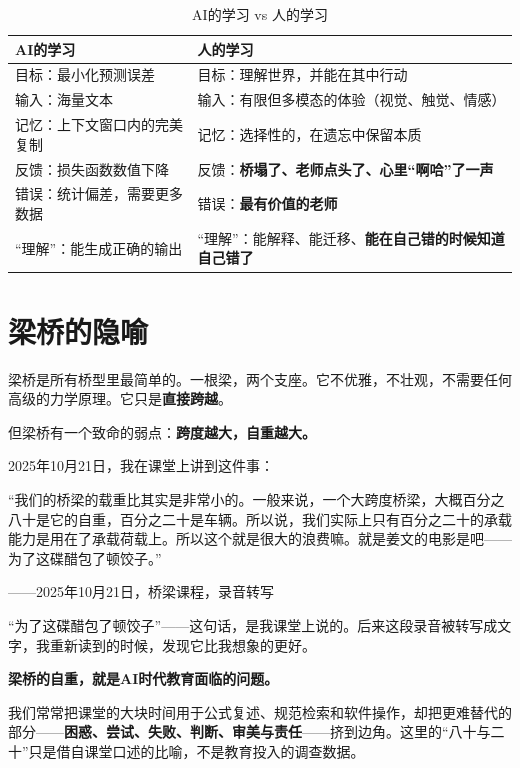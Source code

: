 \begin{table}[H]
\centering
\begin{tabular}{p{} p{}}
\toprule
\textbf{AI的学习} & \textbf{人的学习} \\
\midrule
目标：最小化预测误差 & 目标：理解世界，并能在其中行动 \\
\addlinespace
输入：海量文本 & 输入：有限但多模态的体验（视觉、触觉、情感） \\
\addlinespace
记忆：上下文窗口内的完美复制 & 记忆：选择性的，在遗忘中保留本质 \\
\addlinespace
反馈：损失函数数值下降 & 反馈：\textbf{桥塌了、老师点头了、心里“啊哈”了一声} \\
\addlinespace
错误：统计偏差，需要更多数据 & 错误：\textbf{最有价值的老师} \\
\addlinespace
“理解”：能生成正确的输出 & “理解”：能解释、能迁移、\textbf{能在自己错的时候知道自己错了} \\
\bottomrule
\end{tabular}
\caption{AI的学习 vs 人的学习}
\label{tab:ai-vs-human}
\end{table}

\section{梁桥的隐喻}

梁桥是所有桥型里最简单的。一根梁，两个支座。它不优雅，不壮观，不需要任何高级的力学原理。它只是\textbf{直接跨越}。

但梁桥有一个致命的弱点：\textbf{跨度越大，自重越大。}

2025年10月21日，我在课堂上讲到这件事：

\begin{shiyu-inline}
“我们的桥梁的载重比其实是非常小的。一般来说，一个大跨度桥梁，大概百分之八十是它的自重，百分之二十是车辆。所以说，我们实际上只有百分之二十的承载能力是用在了承载荷载上。所以这个就是很大的浪费嘛。就是姜文的电影是吧——为了这碟醋包了顿饺子。”

\hfill ——2025年10月21日，桥梁课程，录音转写
\end{shiyu-inline}

“为了这碟醋包了顿饺子”——这句话，是我课堂上说的。后来这段录音被转写成文字，我重新读到的时候，发现它比我想象的更好。

\textbf{梁桥的自重，就是AI时代教育面临的问题。}

我们常常把课堂的大块时间用于公式复述、规范检索和软件操作，却把更难替代的部分——\textbf{困惑、尝试、失败、判断、审美与责任}——挤到边角。这里的“八十与二十”只是借自课堂口述的比喻，不是教育投入的调查数据。

